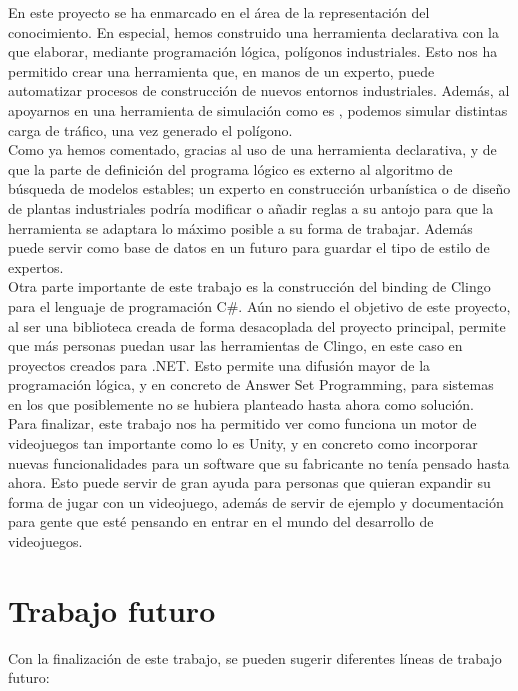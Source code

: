 En este proyecto se ha enmarcado en el área de la representación del conocimiento. En especial, hemos construido una herramienta declarativa con la que elaborar, mediante programación lógica, polígonos industriales. Esto nos ha permitido crear una herramienta que, en manos de un experto, puede automatizar procesos de construcción de nuevos entornos industriales. Además, al apoyarnos en una herramienta de simulación como es \cities, podemos simular distintas carga de tráfico, una vez generado el polígono. \\

Como ya hemos comentado, gracias al uso de una herramienta declarativa, y de que la parte de definición del programa lógico es externo al algoritmo de búsqueda de modelos estables; un experto en construcción urbanística o de diseño de plantas industriales podría modificar o añadir reglas a su antojo para que la herramienta se adaptara lo máximo posible a su forma de trabajar. Además puede servir como base de datos en un futuro para guardar el tipo de estilo de expertos. \\

Otra parte importante de este trabajo es la construcción del binding de Clingo para el lenguaje de programación C\#. Aún no siendo el objetivo de este proyecto, al ser una biblioteca creada de forma desacoplada del proyecto principal, permite que más personas puedan usar las herramientas de Clingo, en este caso en proyectos creados para .NET. Esto permite una difusión mayor de la programación lógica, y en concreto de Answer Set Programming, para sistemas en los que posiblemente no se hubiera planteado hasta ahora como solución. \\

Para finalizar, este trabajo nos ha permitido ver como funciona un motor de videojuegos tan importante como lo es Unity, y en concreto como incorporar nuevas funcionalidades para un software que su fabricante no tenía pensado hasta ahora. Esto puede servir de gran ayuda para personas que quieran expandir su forma de jugar con un videojuego, además de servir de ejemplo y documentación para gente que esté pensando en entrar en el mundo del desarrollo de videojuegos.

\section{Trabajo futuro}

Con la finalización de este trabajo, se pueden sugerir diferentes líneas de trabajo futuro:

